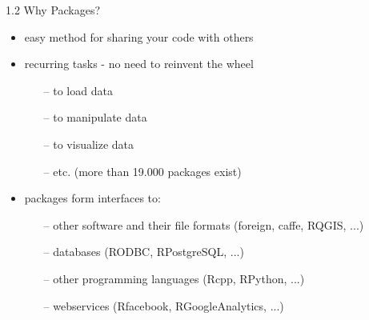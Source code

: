 \documentclass[11pt,a4paper]{beamer}
\begin{document}
	
	\begin{frame}[t]{1.2 Why Packages?}
		
	
		\begin{itemize}
			\item easy method for sharing your code with others 
			\item recurring tasks - no need to reinvent the wheel
			\begin{itemize}
				\item[--] to load data
				\item[--] to manipulate data
				\item[--] to visualize data
				\item[--] etc. (more than 19.000 packages exist)
			\end{itemize}
			\item packages form interfaces to:
			\begin{itemize}
				\item[--] other software and their file formats (foreign, caffe, RQGIS, ...)
				\item[--] databases (RODBC, RPostgreSQL, ...)
				\item[--] other programming languages (Rcpp, RPython, ...)
				\item[--] webservices (Rfacebook, RGoogleAnalytics, ...)
			\end{itemize}
		\end{itemize}
	
	\end{frame}




\end{document}

